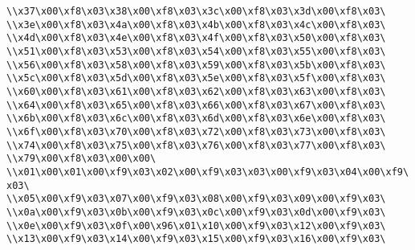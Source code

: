 \verb|\\x37\x00\xf8\x03\x38\x00\xf8\x03\x3c\x00\xf8\x03\x3d\x00\xf8\x03\|\newline
\verb|\\x3e\x00\xf8\x03\x4a\x00\xf8\x03\x4b\x00\xf8\x03\x4c\x00\xf8\x03\|\newline
\verb|\\x4d\x00\xf8\x03\x4e\x00\xf8\x03\x4f\x00\xf8\x03\x50\x00\xf8\x03\|\newline
\verb|\\x51\x00\xf8\x03\x53\x00\xf8\x03\x54\x00\xf8\x03\x55\x00\xf8\x03\|\newline
\verb|\\x56\x00\xf8\x03\x58\x00\xf8\x03\x59\x00\xf8\x03\x5b\x00\xf8\x03\|\newline
\verb|\\x5c\x00\xf8\x03\x5d\x00\xf8\x03\x5e\x00\xf8\x03\x5f\x00\xf8\x03\|\newline
\verb|\\x60\x00\xf8\x03\x61\x00\xf8\x03\x62\x00\xf8\x03\x63\x00\xf8\x03\|\newline
\verb|\\x64\x00\xf8\x03\x65\x00\xf8\x03\x66\x00\xf8\x03\x67\x00\xf8\x03\|\newline
\verb|\\x6b\x00\xf8\x03\x6c\x00\xf8\x03\x6d\x00\xf8\x03\x6e\x00\xf8\x03\|\newline
\verb|\\x6f\x00\xf8\x03\x70\x00\xf8\x03\x72\x00\xf8\x03\x73\x00\xf8\x03\|\newline
\verb|\\x74\x00\xf8\x03\x75\x00\xf8\x03\x76\x00\xf8\x03\x77\x00\xf8\x03\|\newline
\verb|\\x79\x00\xf8\x03\x00\x00\|\newline
\verb|\\x01\x00\x01\x00\xf9\x03\x02\x00\xf9\x03\x03\x00\xf9\x03\x04\x00\xf9\x03\|\newline
\verb|\\x05\x00\xf9\x03\x07\x00\xf9\x03\x08\x00\xf9\x03\x09\x00\xf9\x03\|\newline
\verb|\\x0a\x00\xf9\x03\x0b\x00\xf9\x03\x0c\x00\xf9\x03\x0d\x00\xf9\x03\|\newline
\verb|\\x0e\x00\xf9\x03\x0f\x00\x96\x01\x10\x00\xf9\x03\x12\x00\xf9\x03\|\newline
\verb|\\x13\x00\xf9\x03\x14\x00\xf9\x03\x15\x00\xf9\x03\x16\x00\xf9\x03\|\newline
